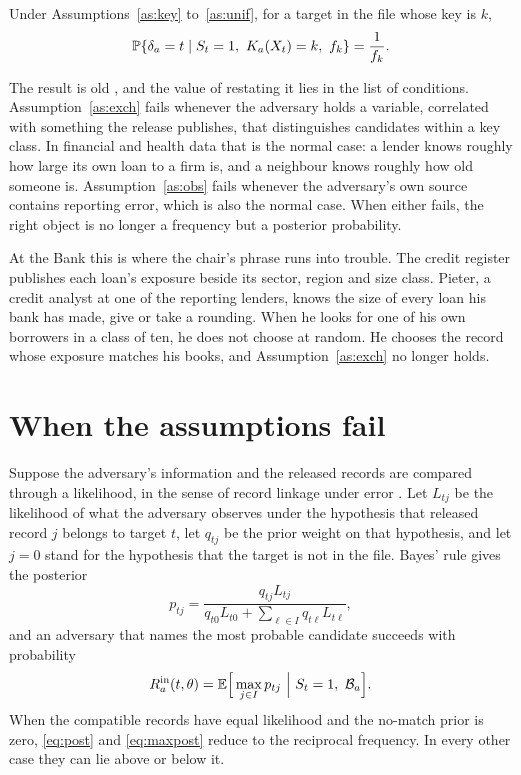 \begin{proposition}\label{prop:recip}
Under Assumptions~\ref{as:key} to~\ref{as:unif}, for a target in the file whose key
is $k$,
\begin{equation}\label{eq:recip}
\mathbb{P}\{\delta_a = t \mid S_t = 1,\ K_a(X_t) = k,\ f_k\} = \frac{1}{f_k}.
\end{equation}
\end{proposition}

The result is old \citep{duncan1989,skinner2002}, and the value of restating it
lies in the list of conditions. Assumption~\ref{as:exch} fails whenever the
adversary holds a variable, correlated with something the release publishes, that
distinguishes candidates within a key class. In financial and health data that is
the normal case: a lender knows roughly how large its own loan to a firm is, and a
neighbour knows roughly how old someone is. Assumption~\ref{as:obs} fails whenever
the adversary's own source contains reporting error, which is also the normal case.
When either fails, the right object is no longer a frequency but a posterior
probability.

At the Bank this is where the chair's phrase runs into trouble. The credit register publishes
each loan's exposure beside its sector, region and size class. Pieter, a credit analyst at
one of the reporting lenders, knows the size of every loan his bank has made, give or take a
rounding. When he looks for one of his own borrowers in a class of ten, he does not choose at
random. He chooses the record whose exposure matches his books, and Assumption~\ref{as:exch}
no longer holds.

\section{When the assumptions fail}

Suppose the adversary's information and the released records are compared through
a likelihood, in the sense of record linkage under error \citep{fellegi1969}. Let
$L_{tj}$ be the likelihood of what the adversary observes under the hypothesis that
released record $j$ belongs to target $t$, let $q_{tj}$ be the prior weight on that
hypothesis, and let $j = 0$ stand for the hypothesis that the target is not in the
file. Bayes' rule gives the posterior
\begin{equation}\label{eq:post}
p_{tj} = \frac{q_{tj}L_{tj}}{q_{t0}L_{t0} + \sum_{\ell \in I} q_{t\ell}L_{t\ell}},
\end{equation}
and an adversary that names the most probable candidate succeeds with probability
\begin{equation}\label{eq:maxpost}
R^{\mathrm{in}}_a(t,\theta) = \mathbb{E}\Big[\max_{j \in I} p_{tj} \ \Big|\ S_t = 1,\ \mathcal{B}_a\Big].
\end{equation}
When the compatible records have equal likelihood and the no-match prior is zero,
\eqref{eq:post} and \eqref{eq:maxpost} reduce to the reciprocal frequency. In every
other case they can lie above or below it.

